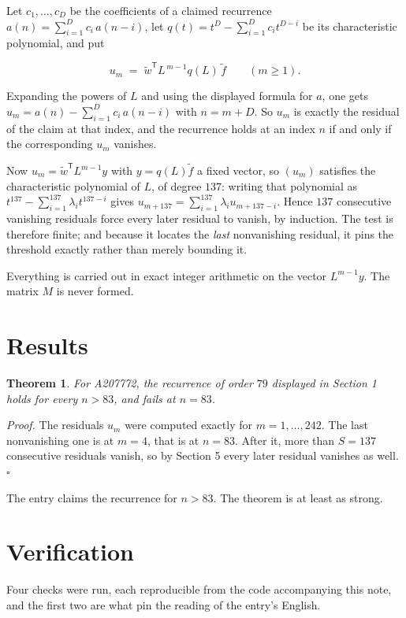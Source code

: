 \documentclass[11pt]{article}
\newtheorem{theorem}{Theorem}
\theoremstyle{definition}
\begin{document}
Let $c_1,\dots,c_D$ be the coefficients of a claimed recurrence $a(n) = \sum_{i=1}^{D} c_i\,a(n-i)$, let $q(t) = t^{D} - \sum_{i=1}^{D} c_i t^{D-i}$ be its characteristic polynomial, and put

\[u_m \;=\; \tilde w^{\mathsf T} L^{\,m-1} q(L)\,\tilde f \qquad (m \ge 1).\]

Expanding the powers of $L$ and using the displayed formula for $a$, one gets $u_m = a(n) - \sum_{i=1}^{D} c_i\,a(n-i)$ with $n = m + D$. So $u_m$ is exactly the residual of the claim at that index, and the recurrence holds at an index $n$ if and only if the corresponding $u_m$ vanishes.

Now $u_m = \tilde w^{\mathsf T} L^{m-1} y$ with $y = q(L)\tilde f$ a fixed vector, so $(u_m)$ satisfies the characteristic polynomial of $L$, of degree $137$: writing that polynomial as $t^{137} - \sum_{i=1}^{137} \lambda_i t^{137-i}$ gives $u_{m+137} = \sum_{i=1}^{137} \lambda_i u_{m+137-i}$. Hence $137$ consecutive vanishing residuals force every later residual to vanish, by induction. The test is therefore finite; and because it locates the {\itshape last} nonvanishing residual, it pins the threshold exactly rather than merely bounding it.

Everything is carried out in exact integer arithmetic on the vector $L^{m-1}y$. The matrix $M$ is never formed.

\section{Results}

\begin{theorem} For A207772, the recurrence of order $79$ displayed in Section 1 holds for every $n > 83$, and fails at $n = 83$.\end{theorem}

{\itshape Proof.} The residuals $u_m$ were computed exactly for $m = 1,\dots,242$. The last nonvanishing one is at $m = 4$, that is at $n = 83$. After it, more than $S = 137$ consecutive residuals vanish, so by Section 5 every later residual vanishes as well. $\square$

The entry claims the recurrence for $n > 83$. The theorem is at least as strong.

\section{Verification}

Four checks were run, each reproducible from the code accompanying this note, and the first two are what pin the reading of the entry's English.
\end{document}
